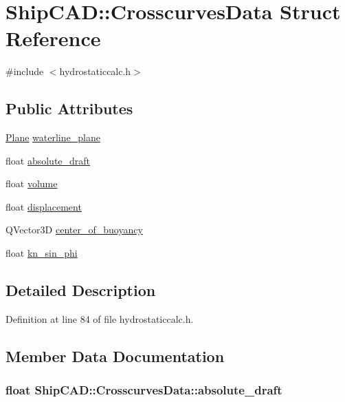 \hypertarget{structShipCAD_1_1CrosscurvesData}{\section{Ship\-C\-A\-D\-:\-:Crosscurves\-Data Struct Reference}
\label{structShipCAD_1_1CrosscurvesData}
}


{\ttfamily \#include $<$hydrostaticcalc.\-h$>$}

\subsection*{Public Attributes}
\begin{DoxyCompactItemize}
\item 
\hyperlink{classShipCAD_1_1Plane}{Plane} \hyperlink{structShipCAD_1_1CrosscurvesData_a1ea6de1b52289e8392e8d499ae4aad04}{waterline\-\_\-plane}
\item 
float \hyperlink{structShipCAD_1_1CrosscurvesData_a759e5729cdb86d8367b139e66fecb7d3}{absolute\-\_\-draft}
\item 
float \hyperlink{structShipCAD_1_1CrosscurvesData_a9bec38a77bf87ab5feb76899e39e4f7b}{volume}
\item 
float \hyperlink{structShipCAD_1_1CrosscurvesData_a9a7baa66159e203888390eaa63caf708}{displacement}
\item 
Q\-Vector3\-D \hyperlink{structShipCAD_1_1CrosscurvesData_a0de723cd5ae0e18953fb7ad5a0f5dadf}{center\-\_\-of\-\_\-buoyancy}
\item 
float \hyperlink{structShipCAD_1_1CrosscurvesData_a55150860fed821e314e18b72f1975749}{kn\-\_\-sin\-\_\-phi}
\end{DoxyCompactItemize}


\subsection{Detailed Description}


Definition at line 84 of file hydrostaticcalc.\-h.



\subsection{Member Data Documentation}
\hypertarget{structShipCAD_1_1CrosscurvesData_a759e5729cdb86d8367b139e66fecb7d3}{
\subsubsection[{absolute\-\_\-draft}]{\setlength{\rightskip}{0pt plus 5cm}float Ship\-C\-A\-D\-::\-Crosscurves\-Data\-::absolute\-\_\-draft}}\label{structShipCAD_1_1CrosscurvesData_a759e5729cdb86d8367b139e66fecb7d3}


